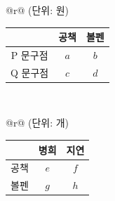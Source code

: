 \begin{tabular}{@{}r@{}}
{\footnotesize (단위: 원)} \\[-1pt]
\begin{tabular}{|c|c|c|}
\hline
 & 공책 & 볼펜 \\
\hline
P 문구점 & $a$ & $b$ \\
\hline
Q 문구점 & $c$ & $d$ \\
\hline
\end{tabular} \\[2pt]
\end{tabular}\hspace{6mm}%
\begin{tabular}{@{}r@{}}
{\footnotesize (단위: 개)} \\[-1pt]
\begin{tabular}{|c|c|c|}
\hline
 & 병희 & 지연 \\
\hline
공책 & $e$ & $f$ \\
\hline
볼펜 & $g$ & $h$ \\
\hline
\end{tabular} \\[2pt]
\end{tabular}
